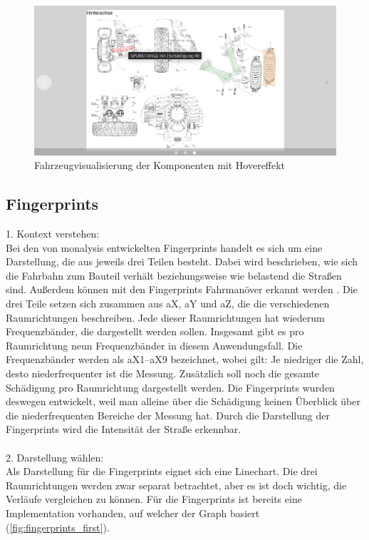 \begin{figure}[h!]
\centering
\includegraphics[width=.8\textwidth]{gfx/vehicle_visualisation_detail.png}
\caption{Fahrzeugvisualisierung der Komponenten mit Hovereffekt}
\label{fig:vehicle_visualization_detail}
\end{figure}
\subsection{Fingerprints}
1. Kontext verstehen:\\
Bei den von monalysis entwickelten Fingerprints \cite{MichaelStadele.2008} handelt es sich um eine Darstellung, die aus jeweils drei Teilen besteht. Dabei wird beschrieben, wie sich die Fahrbahn zum Bauteil verhält beziehungsweise wie belastend die Straßen sind. Außerdem können mit den Fingerprints Fahrmanöver erkannt werden \cite{MichaelStadele.2008}. Die drei Teile setzen sich zusammen aus aX, aY und aZ, die die verschiedenen Raumrichtungen beschreiben. Jede dieser Raumrichtungen hat wiederum Frequenzbänder, die dargestellt werden sollen. Insgesamt gibt es pro Raumrichtung neun Frequenzbänder in diesem Anwendungsfall. Die Frequenzbänder werden als aX1--aX9 bezeichnet, wobei gilt: Je niedriger die Zahl, desto niederfrequenter ist die Messung. Zusätzlich soll noch die gesamte Schädigung pro Raumrichtung dargestellt werden. Die Fingerprints wurden deswegen entwickelt, weil man alleine über die Schädigung keinen Überblick über die niederfrequenten Bereiche der Messung hat. Durch die Darstellung der Fingerprints wird die Intensität der Straße erkennbar.\\\\
2. Darstellung wählen:\\
Als Darstellung für die Fingerprints eignet sich eine Linechart. Die drei Raumrichtungen werden zwar separat betrachtet, aber es ist doch wichtig, die Verläufe vergleichen zu können. Für die Fingerprints ist bereits eine Implementation vorhanden, auf welcher der Graph basiert (\ref{fig:fingerprints_first}).
